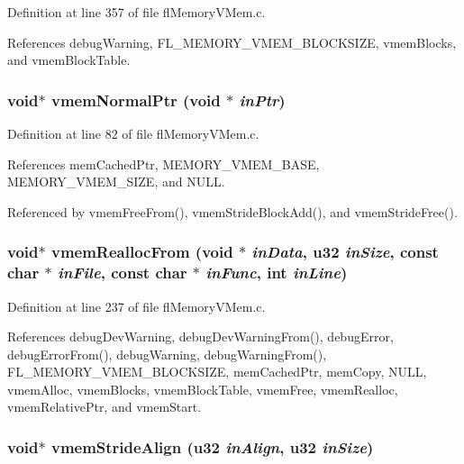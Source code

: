Definition at line 357 of file fl\-Memory\-VMem.c.

References debug\-Warning, FL\_\-MEMORY\_\-VMEM\_\-BLOCKSIZE, vmem\-Blocks, and vmem\-Block\-Table.
\subsubsection{\setlength{\rightskip}{0pt plus 5cm}void$\ast$ vmem\-Normal\-Ptr (void $\ast$ {\em in\-Ptr})}\label{flMemoryVMem_8c_e876e1020d33a6504c9f4a14ff9dcb49}




Definition at line 82 of file fl\-Memory\-VMem.c.

References mem\-Cached\-Ptr, MEMORY\_\-VMEM\_\-BASE, MEMORY\_\-VMEM\_\-SIZE, and NULL.

Referenced by vmem\-Free\-From(), vmem\-Stride\-Block\-Add(), and vmem\-Stride\-Free().
\subsubsection{\setlength{\rightskip}{0pt plus 5cm}void$\ast$ vmem\-Realloc\-From (void $\ast$ {\em in\-Data}, u32 {\em in\-Size}, const char $\ast$ {\em in\-File}, const char $\ast$ {\em in\-Func}, int {\em in\-Line})}\label{flMemoryVMem_8c_512f73544599a5fd0df10e5f9c9ee071}




Definition at line 237 of file fl\-Memory\-VMem.c.

References debug\-Dev\-Warning, debug\-Dev\-Warning\-From(), debug\-Error, debug\-Error\-From(), debug\-Warning, debug\-Warning\-From(), FL\_\-MEMORY\_\-VMEM\_\-BLOCKSIZE, mem\-Cached\-Ptr, mem\-Copy, NULL, vmem\-Alloc, vmem\-Blocks, vmem\-Block\-Table, vmem\-Free, vmem\-Realloc, vmem\-Relative\-Ptr, and vmem\-Start.
\subsubsection{\setlength{\rightskip}{0pt plus 5cm}void$\ast$ vmem\-Stride\-Align (u32 {\em in\-Align}, u32 {\em in\-Size})}\label{flMemoryVMem_8c_d1a90582a0b9a549a0cc3bfd3a142c34}




